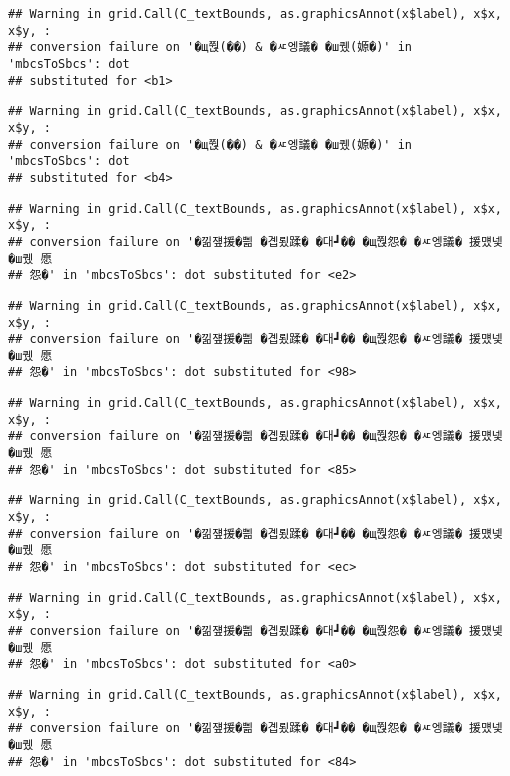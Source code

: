\documentclass[
]{article}
\begin{document}
\begin{verbatim}
## Warning in grid.Call(C_textBounds, as.graphicsAnnot(x$label), x$x, x$y, :
## conversion failure on '�щ쭩(��) & �ㅼ엥議� �ш퀬(嫄�)' in 'mbcsToSbcs': dot
## substituted for <b1>
\end{verbatim}

\begin{verbatim}
## Warning in grid.Call(C_textBounds, as.graphicsAnnot(x$label), x$x, x$y, :
## conversion failure on '�щ쭩(��) & �ㅼ엥議� �ш퀬(嫄�)' in 'mbcsToSbcs': dot
## substituted for <b4>
\end{verbatim}

\begin{verbatim}
## Warning in grid.Call(C_textBounds, as.graphicsAnnot(x$label), x$x, x$y, :
## conversion failure on '�낆쟾援�쁾 �곕룄蹂� �대┛�� �щ쭩怨� �ㅼ엥議� 援먰넻�ш퀬 愿
## 怨�' in 'mbcsToSbcs': dot substituted for <e2>
\end{verbatim}

\begin{verbatim}
## Warning in grid.Call(C_textBounds, as.graphicsAnnot(x$label), x$x, x$y, :
## conversion failure on '�낆쟾援�쁾 �곕룄蹂� �대┛�� �щ쭩怨� �ㅼ엥議� 援먰넻�ш퀬 愿
## 怨�' in 'mbcsToSbcs': dot substituted for <98>
\end{verbatim}

\begin{verbatim}
## Warning in grid.Call(C_textBounds, as.graphicsAnnot(x$label), x$x, x$y, :
## conversion failure on '�낆쟾援�쁾 �곕룄蹂� �대┛�� �щ쭩怨� �ㅼ엥議� 援먰넻�ш퀬 愿
## 怨�' in 'mbcsToSbcs': dot substituted for <85>
\end{verbatim}

\begin{verbatim}
## Warning in grid.Call(C_textBounds, as.graphicsAnnot(x$label), x$x, x$y, :
## conversion failure on '�낆쟾援�쁾 �곕룄蹂� �대┛�� �щ쭩怨� �ㅼ엥議� 援먰넻�ш퀬 愿
## 怨�' in 'mbcsToSbcs': dot substituted for <ec>
\end{verbatim}

\begin{verbatim}
## Warning in grid.Call(C_textBounds, as.graphicsAnnot(x$label), x$x, x$y, :
## conversion failure on '�낆쟾援�쁾 �곕룄蹂� �대┛�� �щ쭩怨� �ㅼ엥議� 援먰넻�ш퀬 愿
## 怨�' in 'mbcsToSbcs': dot substituted for <a0>
\end{verbatim}

\begin{verbatim}
## Warning in grid.Call(C_textBounds, as.graphicsAnnot(x$label), x$x, x$y, :
## conversion failure on '�낆쟾援�쁾 �곕룄蹂� �대┛�� �щ쭩怨� �ㅼ엥議� 援먰넻�ш퀬 愿
## 怨�' in 'mbcsToSbcs': dot substituted for <84>
\end{verbatim}
\end{document}
